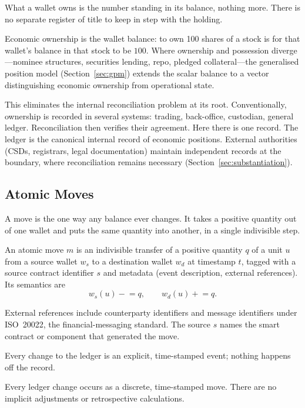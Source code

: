 What a wallet owns is the number standing in its balance, nothing more. There is no separate register of title to keep in step with the holding.

\begin{principle}[Ownership]
Economic ownership is the wallet balance: to own 100 shares of a stock is for that wallet's balance in that stock to be $100$. Where ownership and possession diverge---nominee structures, securities lending, repo, pledged collateral---the generalised position model (Section~\ref{sec:gpm}) extends the scalar balance to a vector distinguishing economic ownership from operational state.
\end{principle}

This eliminates the internal reconciliation problem at its root. Conventionally, ownership is recorded in several systems: trading, back-office, custodian, general ledger. Reconciliation then verifies their agreement. Here there is one record. The ledger is the canonical internal record of economic positions. External authorities (CSDs, registrars, legal documentation) maintain independent records at the boundary, where reconciliation remains necessary (Section~\ref{sec:substantiation}).

\subsection{Atomic Moves}

A move is the one way any balance ever changes. It takes a positive quantity out of one wallet and puts the same quantity into another, in a single indivisible step.

\begin{definition}[Move]
An atomic move $m$ is an indivisible transfer of a positive quantity $q$ of a unit $u$ from a source wallet $w_s$ to a destination wallet $w_d$ at timestamp $t$, tagged with a source contract identifier $s$ and metadata (event description, external references). Its semantics are
\[
w_s(u) \mathrel{-}= q, \qquad w_d(u) \mathrel{+}= q.
\]
\end{definition}

External references include counterparty identifiers and message identifiers under ISO~20022, the financial-messaging standard. The source $s$ names the smart contract or component that generated the move.

Every change to the ledger is an explicit, time-stamped event; nothing happens off the record.

\begin{principle}[Atomicity]
Every ledger change occurs as a discrete, time-stamped move. There are no implicit adjustments or retrospective calculations.
\end{principle}

